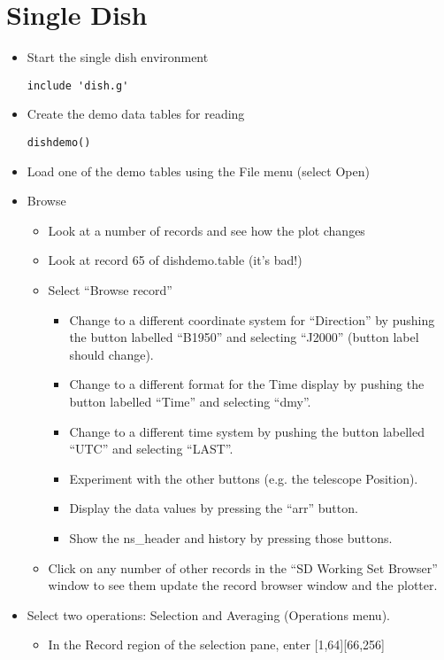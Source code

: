 \section{Single Dish}

\begin{itemize}
\item Start the single dish environment
\begin{verbatim}
include 'dish.g'
\end{verbatim}
\item Create the demo data tables for reading
\begin{verbatim}
dishdemo()
\end{verbatim}
\item Load one of the demo tables using the File menu (select Open)
\item Browse
\begin{itemize}
\item Look at a number of records and see how the plot changes
\item Look at record 65 of dishdemo.table (it's bad!)
\item Select ``Browse record''
\begin{itemize}
\item Change to a different coordinate system for ``Direction'' by pushing
the button labelled ``B1950'' and selecting ``J2000'' (button label should
change).
\item Change to a different format for the Time display by pushing the
button labelled ``Time'' and selecting ``dmy''.
\item Change to a different time system by pushing the button labelled
``UTC'' and selecting ``LAST''.
\item Experiment with the other buttons (e.g. the telescope Position).
\item Display the data values by pressing the ``arr'' button.
\item Show the ns\_header and history by pressing those buttons.
\end{itemize}
\item Click on any number of other records in the ``SD Working Set Browser''
window to see them update the record browser window and the plotter.
\end{itemize}
\item Select two operations: Selection and Averaging (Operations menu).
\begin{itemize}
\item In the Record region of the selection pane, enter [1,64][66,256]

\end{itemize}
\end{itemize}
